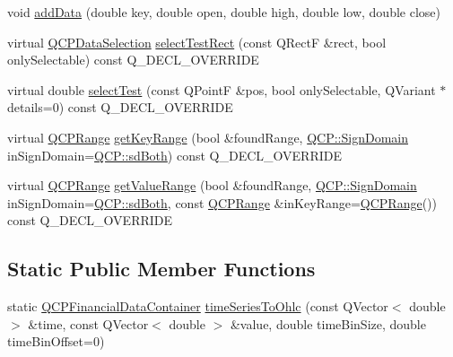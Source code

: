 \begin{DoxyCompactItemize}
\item 
void \hyperlink{classQCPFinancial_a688bbd052e00a02954ddb0068b378170}{add\+Data} (double key, double open, double high, double low, double close)
\item 
virtual \hyperlink{classQCPDataSelection}{Q\+C\+P\+Data\+Selection} \hyperlink{classQCPFinancial_a3c5beb1ab028a1dba845fc9dcffc7cf4}{select\+Test\+Rect} (const Q\+RectF \&rect, bool only\+Selectable) const Q\+\_\+\+D\+E\+C\+L\+\_\+\+O\+V\+E\+R\+R\+I\+DE
\item 
virtual double \hyperlink{classQCPFinancial_aac8e91622ac58330fa9ce81cc8fd40ee}{select\+Test} (const Q\+PointF \&pos, bool only\+Selectable, Q\+Variant $\ast$details=0) const Q\+\_\+\+D\+E\+C\+L\+\_\+\+O\+V\+E\+R\+R\+I\+DE
\item 
virtual \hyperlink{classQCPRange}{Q\+C\+P\+Range} \hyperlink{classQCPFinancial_a15d68fb257113fef697356d65fa76559}{get\+Key\+Range} (bool \&found\+Range, \hyperlink{namespaceQCP_afd50e7cf431af385614987d8553ff8a9}{Q\+C\+P\+::\+Sign\+Domain} in\+Sign\+Domain=\hyperlink{namespaceQCP_afd50e7cf431af385614987d8553ff8a9aa38352ef02d51ddfa4399d9551566e24}{Q\+C\+P\+::sd\+Both}) const Q\+\_\+\+D\+E\+C\+L\+\_\+\+O\+V\+E\+R\+R\+I\+DE
\item 
virtual \hyperlink{classQCPRange}{Q\+C\+P\+Range} \hyperlink{classQCPFinancial_a82d862aa134d78853f98f8c57a03415b}{get\+Value\+Range} (bool \&found\+Range, \hyperlink{namespaceQCP_afd50e7cf431af385614987d8553ff8a9}{Q\+C\+P\+::\+Sign\+Domain} in\+Sign\+Domain=\hyperlink{namespaceQCP_afd50e7cf431af385614987d8553ff8a9aa38352ef02d51ddfa4399d9551566e24}{Q\+C\+P\+::sd\+Both}, const \hyperlink{classQCPRange}{Q\+C\+P\+Range} \&in\+Key\+Range=\hyperlink{classQCPRange}{Q\+C\+P\+Range}()) const Q\+\_\+\+D\+E\+C\+L\+\_\+\+O\+V\+E\+R\+R\+I\+DE
\end{DoxyCompactItemize}
\subsection*{Static Public Member Functions}
\begin{DoxyCompactItemize}
\item 
static \hyperlink{classQCPDataContainer}{Q\+C\+P\+Financial\+Data\+Container} \hyperlink{classQCPFinancial_a9a058c035040d3939b8884f4aaccb1a7}{time\+Series\+To\+Ohlc} (const Q\+Vector$<$ double $>$ \&time, const Q\+Vector$<$ double $>$ \&value, double time\+Bin\+Size, double time\+Bin\+Offset=0)
\end{DoxyCompactItemize}
